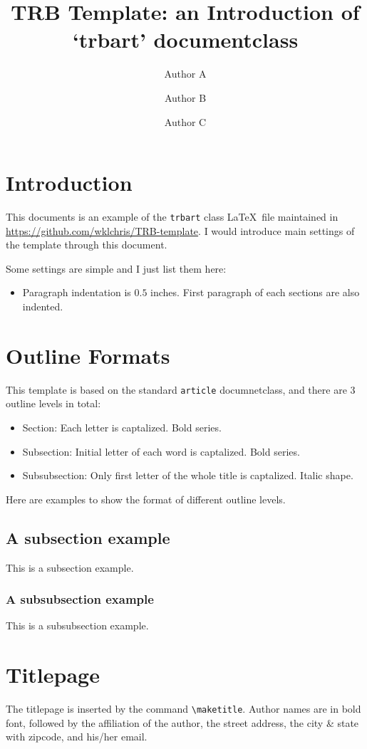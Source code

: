 \documentclass[12pt]{trbart}
\title{TRB Template: an Introduction of `trbart' documentclass}
\author{Author A}
\author{Author B}
\affil{University First\\ Address First\\ \email{first@example.com}}
\author{Author C}
\affil{University Second\\ Address Second\\ \email{second@example.com}}
\date{}
\begin{document}
\linenumbers%
\maketitle


\section{Introduction}
This documents is an example of the \texttt{trbart} class \LaTeX\ file maintained in \url{https://github.com/wklchris/TRB-template}. I would introduce main settings of the template through this document.

Some settings are simple and I just list them here:
\begin{itemize}
    \item Paragraph indentation is \(0.5\) inches. First paragraph of each sections are also indented.
\end{itemize}


\section{Outline Formats}
This template is based on the standard \texttt{article} documnetclass, and there are 3 outline levels in total:
\begin{itemize}
    \item Section: Each letter is captalized. Bold series.
    \item Subsection: Initial letter of each word is captalized. Bold series.
    \item Subsubsection: Only first letter of the whole title is captalized. Italic shape.
\end{itemize}

Here are examples to show the format of different outline levels.

\subsection{A subsection example}
This is a subsection example.

\subsubsection{A subsubsection example}
This is a subsubsection example.


\section{Titlepage}
The titlepage is inserted by the command \verb+\maketitle+. Author names are in bold font, followed by the affiliation of the author, the street address, the city \& state with zipcode, and his/her email.
\end{document}
